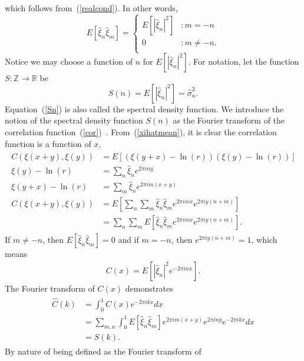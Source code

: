 which follows from~(\ref{realcond}). In other words,
\begin{displaymath}
E[\hat{\xi}_n\hat{\xi}_m] = \left\{
     \begin{array}{lr}
       E[|\hat{\xi}_n|^2] & : m = -n\\
       0 & : m \neq -n.\\
     \end{array}
   \right.
\end{displaymath} 
Notice we may choose a function of $n$ for $E[|\hat{\xi}_n|^2]$. For notation, let the function $S:\mathbb{Z} \to \mathbb{R}$ be
\begin{equation}\label{Sn}
S(n) = E[|\hat{\xi}_n|^2] = \hat{\sigma}_n^2.
\end{equation}
Equation~(\ref{Sn}) is also called the spectral density function. We introduce the notion of the spectral density function $S(n)$ as the Fourier transform
of the correlation
function~(\ref{cor})~\cite{gelhar}. From~(\ref{xihatmean}), it is
clear the correlation function is a function of $x$,
\begin{align*}
\begin{split}
C(\xi(x+y),\xi(y)) &= E[(\xi(y+x) -\ln(r))(\xi(y)-\ln(r))]\\
\xi(y) - \ln(r) &= \sum_n\hat{\xi}_ne^{2\pi iny}\\
\xi(y+x) - \ln(r) &= \sum_m\hat{\xi}_ne^{2\pi im(x+y)}\\
C(\xi(x+y),\xi(y)) &= E\left[\sum_n\sum_m \hat{\xi}_n\hat{\xi}_m e^{2\pi
  imx}e^{2\pi iy(n+m)}\right]\\
&= \sum_n\sum_m E\left[\hat{\xi}_n\hat{\xi}_m e^{2\pi
  imx}e^{2\pi iy(n+m)}\right].
\end{split}
\end{align*}
If $m \neq -n$, then $E[\hat{\xi}_n\hat{\xi}_m]=0$ and if $m =-n$, then $e^{2\pi
  iy(n+m)}=1$, which means
\begin{align*}
C(x) = E[|\hat{\xi}_n|^2 e^{-2\pi inx}].
\end{align*}
The Fourier transform of $C(x)$ demonstrates
\begin{align*}
\begin{split}
\hat{C}(k) &= \int_{0}^{1}C(x)e^{-2\pi ikx}dx\\
&= \sum_{m,n} \int_{0}^{1} E[\hat{\xi}_n\hat{\xi}_m] e^{2\pi
  im(x+y)}e^{2\pi iny}e^{-2\pi ikx}dx\\
&=S(k).
\end{split}
\end{align*}
By nature of being defined as the Fourier transform of
